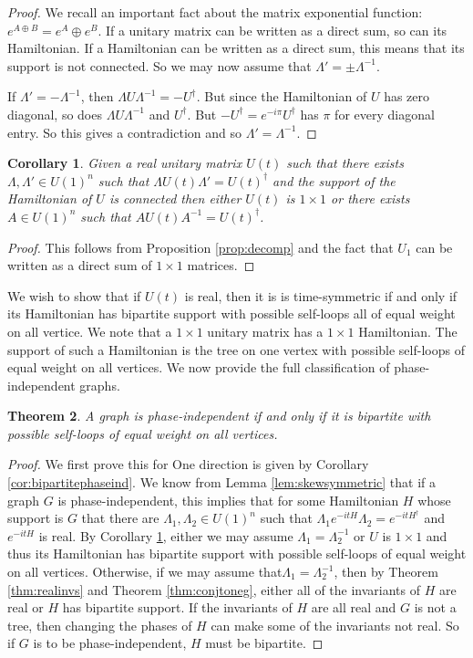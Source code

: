 \documentclass[twocolumn,superscriptaddress]{revtex4-1}
\theoremstyle{plain}
\newtheorem{theorem}{Theorem}[section]
\newtheorem{corollary}[theorem]{Corollary}
\theoremstyle{definition}
\theoremstyle{definition}
\theoremstyle{definition}
\theoremstyle{definition}
\theoremstyle{definition}
\theoremstyle{definition}
\begin{document}
\begin{proof}
 
 We recall an important fact about the matrix exponential function: $e^{A\oplus B}=e^A\oplus e^B$. If a unitary matrix can be written as a direct sum, so can its Hamiltonian. If a Hamiltonian can be written as a direct sum, this means that its support is not connected. So we may now assume that $\Lambda'=\pm \Lambda^{-1}$. 
 
 If $\Lambda'=-\Lambda^{-1}$, then $\Lambda U\Lambda^{-1}=-U^\dagger$. But since the Hamiltonian of $U$ has zero diagonal, so does $\Lambda U\Lambda^{-1}$ and $U^\dagger$. But $-U^\dagger=e^{-i\pi} U^\dagger$ has $\pi$ for every diagonal entry. So this gives a contradiction and so $\Lambda'=\Lambda^{-1}$.
\end{proof}

 

\begin{corollary}\label{cor:twocases}
 Given a real unitary matrix $U(t)$ such that there exists $\Lambda,\Lambda'\in U(1)^n$ such that $\Lambda U(t)\Lambda'=U(t)^\dagger$ and the support of the Hamiltonian of $U$ is connected then either $U(t)$ is $1\times 1$ or there exists $A\in U(1)^n$ such that $A U(t)A^{-1}=U(t)^\dagger$.
\end{corollary}
\begin{proof}
 This follows from Proposition \ref{prop:decomp} and the fact that $U_1$ can be written as a direct sum of $1\times 1$ matrices. 
\end{proof}

We wish to show that if $U(t)$ is real, then it is is time-symmetric if and only if its Hamiltonian has bipartite support with possible self-loops all of equal weight on all vertice. We note that a $1\times 1$ unitary matrix has a $1\times 1$ Hamiltonian. The support of such a Hamiltonian is the tree on one vertex with possible self-loops of equal weight on all vertices. We now provide the full classification of phase-independent graphs.

\begin{theorem}\label{thm:classify}
 A graph is phase-independent if and only if it is bipartite with possible self-loops of equal weight on all vertices.
\end{theorem}
\begin{proof}
We first prove this for One direction is given by Corollary \ref{cor:bipartitephaseind}.  We know from Lemma \ref{lem:skewsymmetric} that if a graph $G$ is phase-independent, this implies that for some Hamiltonian $H$ whose support is $G$ that there are $\Lambda_1,\Lambda_2\in U(1)^n$ such that $\Lambda_1 e^{-itH}\Lambda_2=e^{-itH^\dagger}$ and $e^{-itH}$ is real. By Corollary \ref{cor:twocases}, either we may assume $\Lambda_1=\Lambda_2^{-1}$ or $U$ is $1\times 1$ and thus its Hamiltonian has bipartite support with possible self-loops of equal weight on all vertices. Otherwise, if we may assume that$\Lambda_1=\Lambda_2^{-1}$, then by Theorem \ref{thm:realinvs} and Theorem \ref{thm:conjtoneg}, either all of the invariants of $H$ are real or $H$ has bipartite support. If the invariants of $H$ are all real and $G$ is not a tree, then changing the phases of $H$ can make some of the invariants not real. So if $G$ is to be phase-independent, $H$ must be bipartite. 
\end{proof}
\end{document}
